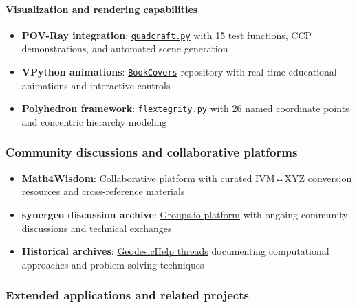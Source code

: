 \documentclass[
  10pt,
]{article}
\providecommand{\tightlist}{%
  \setlength{\itemsep}{0pt}\setlength{\parskip}{0pt}}
\begin{document}
\hypertarget{visualization-and-rendering-capabilities}{%
\paragraph{Visualization and rendering
capabilities}\label{visualization-and-rendering-capabilities}}

\begin{itemize}
\tightlist
\item
  \textbf{POV-Ray integration}:
  \href{https://github.com/4dsolutions/School_of_Tomorrow/blob/master/quadcraft.py}{\texttt{quadcraft.py}}
  with 15 test functions, CCP demonstrations, and automated scene
  generation
\item
  \textbf{VPython animations}:
  \href{https://github.com/4dsolutions/BookCovers}{\texttt{BookCovers}}
  repository with real-time educational animations and interactive
  controls
\item
  \textbf{Polyhedron framework}:
  \href{https://github.com/4dsolutions/School_of_Tomorrow/blob/master/flextegrity.py}{\texttt{flextegrity.py}}
  with 26 named coordinate points and concentric hierarchy modeling
\end{itemize}

\hypertarget{community-discussions-and-collaborative-platforms}{%
\subsubsection{Community discussions and collaborative
platforms}\label{community-discussions-and-collaborative-platforms}}

\begin{itemize}
\tightlist
\item
  \textbf{Math4Wisdom}:
  \href{https://coda.io/@daniel-ari-friedman/math4wisdom/ivm-xyz-40}{Collaborative
  platform} with curated IVM↔XYZ conversion resources and
  cross-reference materials
\item
  \textbf{synergeo discussion archive}:
  \href{https://groups.io/g/synergeo/topics}{Groups.io platform} with
  ongoing community discussions and technical exchanges
\item
  \textbf{Historical archives}:
  \href{https://groups.google.com/g/GeodesicHelp/}{GeodesicHelp threads}
  documenting computational approaches and problem-solving techniques
\end{itemize}

\hypertarget{extended-applications-and-related-projects}{%
\subsubsection{Extended applications and related
projects}\label{extended-applications-and-related-projects}}
\end{document}
